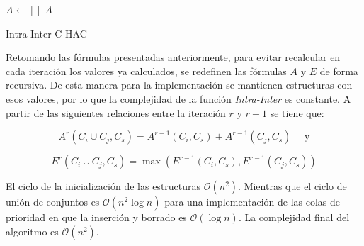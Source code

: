 \begin{center}
	\begin{algorithm}[H]
	\DontPrintSemicolon
	\SetAlgoLined
		$A \leftarrow []$\;
		\Return $A$\;
	\caption{Intra-Inter C-HAC}\label{alg:Intra-Inter C-HAC}
	\end{algorithm}
\end{center}

Retomando las fórmulas presentadas anteriormente, para evitar recalcular en cada iteración los valores ya calculados, se redefinen las fórmulas $A$ y $E$ de forma recursiva. De esta manera para la implementación se mantienen estructuras con esos valores, por lo que la complejidad de la función \textit{Intra-Inter} es constante. A partir de las siguientes relaciones entre la iteración $r$ y $r-1$ se tiene que:

$$A^r(C_i \cup C_j, C_s) = A^{r-1}(C_i,C_s) + A^{r-1}(C_j,C_s) \quad \mbox{ y}$$

$$E^r(C_i \cup C_j,C_s) = \max (E^{r-1}(C_i,C_s),E^{r-1}(C_j,C_s))$$

El ciclo de la inicialización de las estructuras $\mathcal{O}(n^{2})$. Mientras que el ciclo de unión de conjuntos es $\mathcal{O}(n^{2}\log n)$ para una implementación de las colas de prioridad en que la inserción y borrado es $\mathcal{O}(\log n)$. La complejidad final del algoritmo es $\mathcal{O}(n^{2})$.

